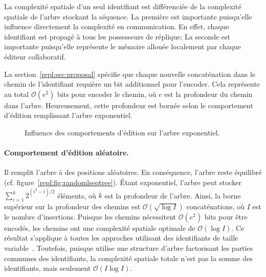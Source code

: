 La complexité spatiale d'un seul identifiant est différenciée de la complexité
spatiale de l'arbre stockant la séquence. La première est importante puisqu'elle
influence directement la complexité en communication. En effet, chaque
identifiant est propagé à tous les possesseurs de réplique; La seconde est
importante puisqu'elle représente le mémoire allouée localement par chaque
éditeur collaboratif.

La section~\ref{repl:sec:proposal} spécifie que chaque nouvelle concaténation
dans le chemin de l'identifiant requière un bit additionnel pour l'encoder. Cela
représente au total $\mathcal{O}(e^2)$ bits pour encoder le chemin, où $e$ est
la profondeur du chemin dans l'arbre. Heureusement, cette profondeur est bornée
selon le comportement d'édition remplissant l'arbre exponentiel. 


\begin{figure}
  \begin{center}
    \hspace{10pt}
    \hspace{10pt}
    \caption[Influence des comportements d'édition sur l'arbre exponentiel]
    {Influence des comportements d'édition sur l'arbre exponentiel.}
  \end{center}
\end{figure}


\paragraph{Comportement d'édition aléatoire. } Il remplit l'arbre à des
positions aléatoires. En conséquence, l'arbre reste équilibré
(cf. figure~\ref{repl:fig:randomlseqtree}). Étant exponentiel, l'arbre peut
stocker $\textstyle\sum\nolimits_{i=1}^{k}{2^{(i^2-i)/2}}$ éléments, où $k$ est
la profondeur de l'arbre. Ainsi, la borne supérieur sur la profondeur des
chemins est $\mathcal{O}(\sqrt{\log I})$ concaténations, où $I$ est le nombre
d'insertions. Puisque les chemins nécessitent $\mathcal{O}(e^2)$ bits pour être
encodés, les chemins ont une complexité spatiale optimale de
$\mathcal{O}(\log I)$. Ce résultat s'applique à toutes les approches utilisant
des identifiants de taille variable~\cite{preguica2009commutative,
  weiss2009logoot}. Toutefois, puisque \LSEQ utilise une structure d'arbre
factorisant les parties communes des identifiants, la complexité spatiale totale
n'est pas la somme des identifiants, mais seulement $\mathcal{O}(I\log I)$.

